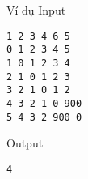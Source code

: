 Ví dụ
Input
\begin{verbatim}
1 2 3 4 6 5
0 1 2 3 4 5
1 0 1 2 3 4
2 1 0 1 2 3
3 2 1 0 1 2
4 3 2 1 0 900
5 4 3 2 900 0\end{verbatim}

Output
\begin{verbatim}
4\end{verbatim}